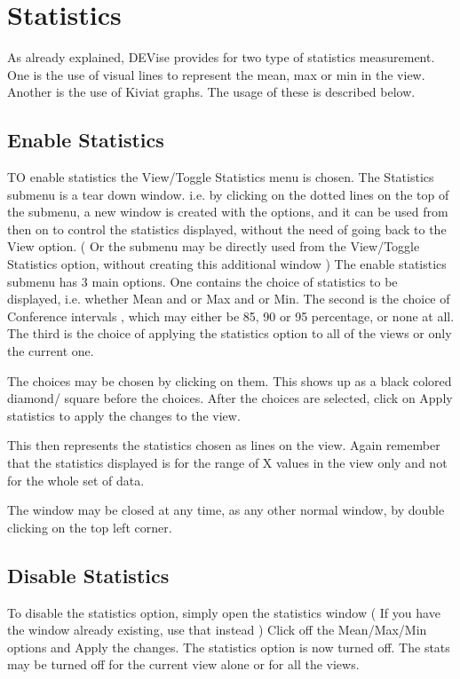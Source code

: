 \section{Statistics}

As already explained, DEVise provides for two type of statistics measurement. One is the use of visual lines to represent the mean, max or min in the view. Another is the use of Kiviat graphs. The usage of these is described below.

\subsection{Enable Statistics}

TO enable statistics the View/Toggle Statistics menu is chosen. The Statistics submenu is a tear down window. i.e. by clicking on the dotted lines on the top of the submenu, a new window is created with the options, and it can be used from then on to control the statistics displayed, without the need of going back to the View option. ( Or the submenu may be directly used from the View/Toggle Statistics option, without creating this additional window ) The enable statistics submenu has 3 main options. One contains the choice of statistics to be displayed, i.e. whether Mean and or Max and or Min. The second is the choice of Conference intervals , which may either be 85, 90 or 95 percentage, or none at all. The third is the choice of applying the statistics option to all of the views or only the current one.

The choices may be chosen by clicking on them. This shows up as a black colored diamond/ square  before the choices. After the choices are selected, click on Apply statistics to apply the changes to the view.

This then represents the statistics chosen as lines on the view. Again remember that the statistics displayed is for the range of X values in the view only and not for the whole set of data.

The window may be closed at any time, as any other normal window, by double clicking on the top left corner.

\subsection{Disable Statistics}

To disable the statistics option, simply open the statistics window ( If you have the window already existing, use that instead ) Click off the Mean/Max/Min options and Apply the changes. The statistics option is now turned off. The stats may be turned off for the current view alone or for all the views.

